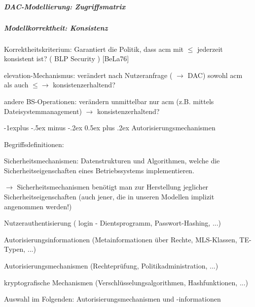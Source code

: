 \documentclass[a4paper]{article}
\makeatletter
\renewcommand{\subsection}{\@startsection{subsection}{2}{0mm}%
 {-1explus -.5ex minus -.2ex}%
 {0.5ex plus .2ex}%
 {\normalfont\normalsize\bfseries}}
\makeatother
\begin{document}
\begin{multicols}{3}
    \subparagraph{DAC-Modellierung:
        Zugriffsmatrix}



    \subparagraph{Modellkorrektheit:
        Konsistenz}

    \begin{itemize*}
        \item
        Korrektheitskriterium: Garantiert die Politik, dass acm mit
        $\leq$ jederzeit konsistent ist? ( BLP Security )
        [BeLa76]
        \item
        elevation-Mechanismus: verändert nach Nutzeranfrage
        ( $\rightarrow$ DAC) sowohl acm als auch
        $\leq\rightarrow$ konsistenzerhaltend?
        \item
        andere BS-Operationen: verändern unmittelbar nur acm (z.B. mittels
        Dateisystemmanagement) $\rightarrow$
        konsistenzerhaltend?
    \end{itemize*}


    \subsection{Autorisierungsmechanismen}

    Begriffsdefinitionen:

    \begin{itemize*}
        \item
        Sicherheitsmechanismen: Datenstrukturen und Algorithmen, welche die
        Sicherheitseigenschaften eines Betriebssystems implementieren.
        \begin{itemize*}
            \item[$\rightarrow$] Sicherheitsmechanismen benötigt man zur Herstellung jeglicher Sicherheitseigenschaften (auch jener, die in unseren Modellen implizit angenommen werden!)
            \item Nutzerauthentisierung ( login - Dientsprogramm, Passwort-Hashing, ...)
            \item Autorisierungsinformationen (Metainformationen über Rechte, MLS-Klassen, TE-Typen, ...)
            \item Autorisierungsmechanismen (Rechteprüfung, Politikadministration, ...)
            \item kryptografische Mechanismen (Verschlüsselungsalgorithmen, Hashfunktionen, ...)
        \end{itemize*}
        \item
        Auswahl im Folgenden: Autorisierungsmechanismen und -informationen
    \end{itemize*}



\end{multicols}
\end{document}
